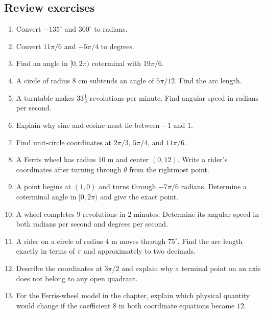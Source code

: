 \subsection{Review exercises}
\begin{enumerate}
\item Convert $-135^\circ$ and $300^\circ$ to radians.
\item Convert $11\pi/6$ and $-5\pi/4$ to degrees.
\item Find an angle in $[0,2\pi)$ coterminal with $19\pi/6$.
\item A circle of radius $8$ cm subtends an angle of $5\pi/12$. Find the arc length.
\item A turntable makes $33\frac13$ revolutions per minute. Find angular speed in radians per second.
\item Explain why sine and cosine must lie between $-1$ and $1$.
\item Find unit-circle coordinates at $2\pi/3$, $5\pi/4$, and $11\pi/6$.
\item A Ferris wheel has radius $10$ m and center $(0,12)$. Write a rider's coordinates after turning through $\theta$ from the rightmost point.

\item A point begins at $(1,0)$ and turns through $-7\pi/6$ radians. Determine a coterminal angle in $[0,2\pi)$ and give the exact point.
\item A wheel completes $9$ revolutions in $2$ minutes. Determine its angular speed in both radians per second and degrees per second.
\item A rider on a circle of radius $4$ m moves through $75^\circ$. Find the arc length exactly in terms of $\pi$ and approximately to two decimals.
\item Describe the coordinates at $3\pi/2$ and explain why a terminal point on an axis does not belong to any open quadrant.
\item For the Ferris-wheel model in the chapter, explain which physical quantity would change if the coefficient $8$ in both coordinate equations became $12$.
\end{enumerate}

\clearpage
